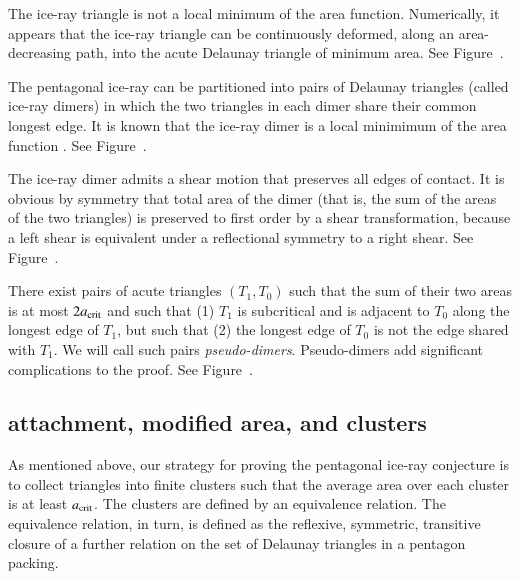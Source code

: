 
\begin{example}  
  The ice-ray triangle is not a local minimum of the area function.
  Numerically, it appears that the ice-ray triangle can be
  continuously deformed, along an area-decreasing path, into the acute
  Delaunay triangle of minimum area. See Figure~.
\end{example}


\begin{example}  
  The pentagonal ice-ray can be partitioned into pairs of Delaunay
  triangles (called ice-ray dimers) in which the two triangles in each
  dimer share their common longest edge.  It is known that the ice-ray
  dimer is a local minimimum of the area function \cite{Kus}. See
  Figure~.
\end{example}


\begin{example} 
  The ice-ray dimer admits a shear motion that preserves all edges of
  contact.  It is obvious by symmetry that total area of the dimer
  (that is, the sum of the areas of the two triangles) is preserved to
  first order by a shear transformation, because a left shear is
  equivalent under a reflectional symmetry to a right shear.  See
  Figure~.
\end{example}


\begin{example} 
  There exist pairs of acute triangles $(T_1,T_0)$ such that the sum
  of their two areas is at most $2a_\text{crit}$ and such that (1) $T_1$ is
  subcritical and is adjacent to $T_0$ along the longest edge of
  $T_1$, but such that (2) the longest edge of $T_0$ is not the edge
  shared with $T_1$.  We will call such pairs {\it pseudo-dimers}.
  Pseudo-dimers add significant complications to the proof.  See
  Figure~.
\end{example}


\subsection{attachment, modified area, and clusters}

As mentioned above, our strategy for proving the pentagonal ice-ray
conjecture is to collect triangles into finite clusters such that the
average area over each cluster is at least $a_\text{crit}$.  The clusters are
defined by an equivalence relation.  The equivalence relation, in
turn, is defined as the reflexive, symmetric, transitive closure of a
further relation on the set of Delaunay triangles in a pentagon
packing.

